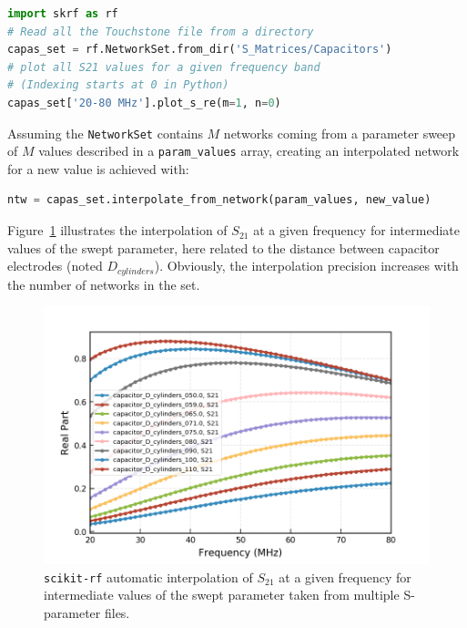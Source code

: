 \begin{lstlisting}[language=Python]
import skrf as rf
# Read all the Touchstone file from a directory
capas_set = rf.NetworkSet.from_dir('S_Matrices/Capacitors')
# plot all S21 values for a given frequency band
# (Indexing starts at 0 in Python)
capas_set['20-80 MHz'].plot_s_re(m=1, n=0)
\end{lstlisting}

Assuming the \texttt{NetworkSet} contains $M$ networks coming from a parameter sweep of $M$ values described in a \texttt{param\_values} array, creating an interpolated network for a new value is achieved with:

\begin{lstlisting}[language=Python]
ntw = capas_set.interpolate_from_network(param_values, new_value)\end{lstlisting}

Figure~\ref{fig:capassets21db} illustrates the interpolation of $S_{21}$ at a given frequency for intermediate values of the swept parameter, here related to the distance between capacitor electrodes (noted $D_{cylinders}$). Obviously, the interpolation precision increases with the number of networks in the set.

\begin{figure}
	\centering
	\includegraphics[width=1.0\linewidth]{figures/chap3/WEST_ICRH/capas_set_S21db}
	\caption{\texttt{scikit-rf} automatic interpolation of $S_{21}$ at a given frequency for intermediate values of the swept parameter taken from multiple S-parameter files. }
	\label{fig:capassets21db}
\end{figure}


